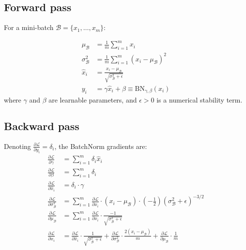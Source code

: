 \subsection{Forward pass}

For a mini-batch $\mathcal{B} = \{x_1, \ldots, x_m\}$:

\begin{keyformulas}[title=\textbf{Batch Normalization -- Forward pass}]
\begin{align}
\mu_{\mathcal{B}} &= \frac{1}{m} \sum_{i=1}^m x_i
\label{eq:bn-mean} \\
\sigma_{\mathcal{B}}^2 &= \frac{1}{m} \sum_{i=1}^m (x_i - \mu_{\mathcal{B}})^2
\label{eq:bn-var} \\
\hat{x}_i &= \frac{x_i - \mu_{\mathcal{B}}}{\sqrt{\sigma_{\mathcal{B}}^2 + \epsilon}}
\label{eq:bn-norm} \\
y_i &= \gamma \hat{x}_i + \beta \equiv \text{BN}_{\gamma, \beta}(x_i)
\label{eq:bn-output}
\end{align}
where $\gamma$ and $\beta$ are learnable parameters, and
$\epsilon > 0$ is a numerical stability term.
\end{keyformulas}

\subsection{Backward pass}

\begin{proposition}
Denoting $\frac{\partial \mathcal{L}}{\partial y_i} = \delta_i$, the
BatchNorm gradients are:
\begin{align}
\frac{\partial \mathcal{L}}{\partial \gamma}
  &= \sum_{i=1}^m \delta_i \hat{x}_i \\
\frac{\partial \mathcal{L}}{\partial \beta}
  &= \sum_{i=1}^m \delta_i \\
\frac{\partial \mathcal{L}}{\partial \hat{x}_i}
  &= \delta_i \cdot \gamma \\
\frac{\partial \mathcal{L}}{\partial \sigma_{\mathcal{B}}^2}
  &= \sum_{i=1}^m \frac{\partial \mathcal{L}}{\partial \hat{x}_i}
     \cdot (x_i - \mu_{\mathcal{B}})
     \cdot \left(-\frac{1}{2}\right)(\sigma_{\mathcal{B}}^2 + \epsilon)^{-3/2} \\
\frac{\partial \mathcal{L}}{\partial \mu_{\mathcal{B}}}
  &= \sum_{i=1}^m \frac{\partial \mathcal{L}}{\partial \hat{x}_i}
     \cdot \frac{-1}{\sqrt{\sigma_{\mathcal{B}}^2 + \epsilon}} \\
\frac{\partial \mathcal{L}}{\partial x_i}
  &= \frac{\partial \mathcal{L}}{\partial \hat{x}_i}
     \cdot \frac{1}{\sqrt{\sigma_{\mathcal{B}}^2 + \epsilon}}
   + \frac{\partial \mathcal{L}}{\partial \sigma_{\mathcal{B}}^2}
     \cdot \frac{2(x_i - \mu_{\mathcal{B}})}{m}
   + \frac{\partial \mathcal{L}}{\partial \mu_{\mathcal{B}}} \cdot \frac{1}{m}
\end{align}
\end{proposition}

